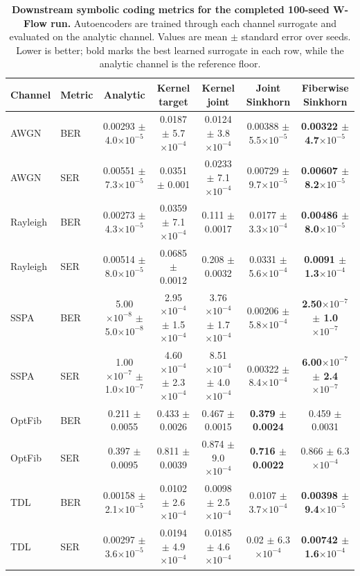 \begin{table}[t]
\centering
\caption{\textbf{Downstream symbolic coding metrics for the completed 100-seed W-Flow run.} Autoencoders are trained through each channel surrogate and evaluated on the analytic channel. Values are mean $\pm$ standard error over seeds. Lower is better; bold marks the best learned surrogate in each row, while the analytic channel is the reference floor.}
\label{tab:wflow-ser-ber}
\tablefontsize
\begin{tabular}{@{}llccccc@{}}
\toprule
Channel & Metric & Analytic & Kernel target & Kernel joint & Joint Sinkhorn & Fiberwise Sinkhorn \\
\midrule
AWGN & BER & 0.00293 $\pm$ 4.0$\times 10^{-5}$ & 0.0187 $\pm$ 5.7$\times 10^{-4}$ & 0.0124 $\pm$ 3.8$\times 10^{-4}$ & 0.00388 $\pm$ 5.5$\times 10^{-5}$ & \textbf{0.00322 $\pm$ 4.7$\times 10^{-5}$} \\
AWGN & SER & 0.00551 $\pm$ 7.3$\times 10^{-5}$ & 0.0351 $\pm$ 0.001 & 0.0233 $\pm$ 7.1$\times 10^{-4}$ & 0.00729 $\pm$ 9.7$\times 10^{-5}$ & \textbf{0.00607 $\pm$ 8.2$\times 10^{-5}$} \\
\midrule
Rayleigh & BER & 0.00273 $\pm$ 4.3$\times 10^{-5}$ & 0.0359 $\pm$ 7.1$\times 10^{-4}$ & 0.111 $\pm$ 0.0017 & 0.0177 $\pm$ 3.3$\times 10^{-4}$ & \textbf{0.00486 $\pm$ 8.0$\times 10^{-5}$} \\
Rayleigh & SER & 0.00514 $\pm$ 8.0$\times 10^{-5}$ & 0.0685 $\pm$ 0.0012 & 0.208 $\pm$ 0.0032 & 0.0331 $\pm$ 5.6$\times 10^{-4}$ & \textbf{0.0091 $\pm$ 1.3$\times 10^{-4}$} \\
\midrule
SSPA & BER & 5.00$\times 10^{-8}$ $\pm$ 5.0$\times 10^{-8}$ & 2.95$\times 10^{-4}$ $\pm$ 1.5$\times 10^{-4}$ & 3.76$\times 10^{-4}$ $\pm$ 1.7$\times 10^{-4}$ & 0.00206 $\pm$ 5.8$\times 10^{-4}$ & \textbf{2.50$\times 10^{-7}$ $\pm$ 1.0$\times 10^{-7}$} \\
SSPA & SER & 1.00$\times 10^{-7}$ $\pm$ 1.0$\times 10^{-7}$ & 4.60$\times 10^{-4}$ $\pm$ 2.3$\times 10^{-4}$ & 8.51$\times 10^{-4}$ $\pm$ 4.0$\times 10^{-4}$ & 0.00322 $\pm$ 8.4$\times 10^{-4}$ & \textbf{6.00$\times 10^{-7}$ $\pm$ 2.4$\times 10^{-7}$} \\
\midrule
OptFib & BER & 0.211 $\pm$ 0.0055 & 0.433 $\pm$ 0.0026 & 0.467 $\pm$ 0.0015 & \textbf{0.379 $\pm$ 0.0024} & 0.459 $\pm$ 0.0031 \\
OptFib & SER & 0.397 $\pm$ 0.0095 & 0.811 $\pm$ 0.0039 & 0.874 $\pm$ 9.0$\times 10^{-4}$ & \textbf{0.716 $\pm$ 0.0022} & 0.866 $\pm$ 6.3$\times 10^{-4}$ \\
\midrule
TDL & BER & 0.00158 $\pm$ 2.1$\times 10^{-5}$ & 0.0102 $\pm$ 2.6$\times 10^{-4}$ & 0.0098 $\pm$ 2.5$\times 10^{-4}$ & 0.0107 $\pm$ 3.7$\times 10^{-4}$ & \textbf{0.00398 $\pm$ 9.4$\times 10^{-5}$} \\
TDL & SER & 0.00297 $\pm$ 3.6$\times 10^{-5}$ & 0.0194 $\pm$ 4.9$\times 10^{-4}$ & 0.0185 $\pm$ 4.6$\times 10^{-4}$ & 0.02 $\pm$ 6.3$\times 10^{-4}$ & \textbf{0.00742 $\pm$ 1.6$\times 10^{-4}$} \\
\bottomrule
\end{tabular}
\end{table}
